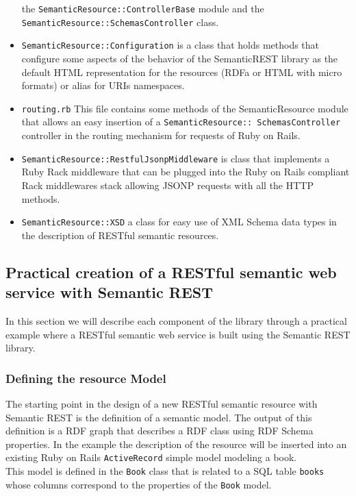 \begin{itemize}
  the \texttt{SemanticResource::ControllerBase} module and the \texttt{SemanticResource::SchemasController} class.
\item \texttt{SemanticResource::Configuration} is a class that holds methods that configure some aspects of the
  behavior of the SemanticREST library as the default HTML representation for the resources (RDFa or HTML with
  micro formats) or alias for URIs namespaces.
\item \texttt{routing.rb} This file contains some methods of the SemanticResource module that allows an easy insertion
  of a \texttt{SemanticResource:: SchemasController} controller in the routing mechanism for requests of Ruby on Rails.
\item \texttt{SemanticResource::RestfulJsonpMiddleware} is class that implements a Ruby Rack middleware that can be
  plugged into the Ruby on Rails compliant Rack middlewares stack allowing JSONP requests with all the HTTP methods.
\item \texttt{SemanticResource::XSD} a class for easy use of XML Schema data types in the description of RESTful semantic resources.
\end{itemize}

\subsection{Practical creation of a RESTful semantic web service with Semantic REST}

In this section we will describe each component of the library through a practical example where a RESTful
semantic web service is built using the Semantic REST library.

\subsubsection{Defining the resource Model}
The starting point in the design of a new RESTful semantic resource with Semantic REST is the definition of a semantic
model. The output of this definition is a RDF graph that describes a RDF class using RDF Schema properties. In the
example the description of the resource will be inserted into an existing Ruby on Rails \texttt{ActiveRecord} simple model
modeling a book.\\

This model is defined in the \texttt{Book} class that is related to a SQL table \texttt{books} whose columns correspond
to the properties of the \texttt{Book} model.

